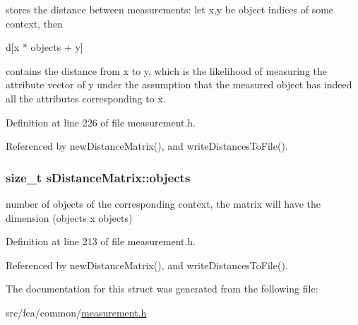 stores the distance between measurements\-: let x,y be object indices of some context, then 

d\mbox{[}x $\ast$ objects + y\mbox{]}

contains the distance from x to y, which is the likelihood of measuring the attribute vector of y under the assumption that the measured object has indeed all the attributes corresponding to x. 

\-Definition at line 226 of file measurement.\-h.



\-Referenced by new\-Distance\-Matrix(), and write\-Distances\-To\-File().

\hypertarget{structsDistanceMatrix_a29d599ff7b9002cc4d88f14bae637ebf}{
\subsubsection[{objects}]{\setlength{\rightskip}{0pt plus 5cm}size\-\_\-t {\bf s\-Distance\-Matrix\-::objects}}}\label{structsDistanceMatrix_a29d599ff7b9002cc4d88f14bae637ebf}


number of objects of the corresponding context, the matrix will have the dimension (objects x objects) 



\-Definition at line 213 of file measurement.\-h.



\-Referenced by new\-Distance\-Matrix(), and write\-Distances\-To\-File().



\-The documentation for this struct was generated from the following file\-:\begin{DoxyCompactItemize}
\item 
src/fca/common/\hyperlink{common_2measurement_8h}{measurement.\-h}\end{DoxyCompactItemize}

